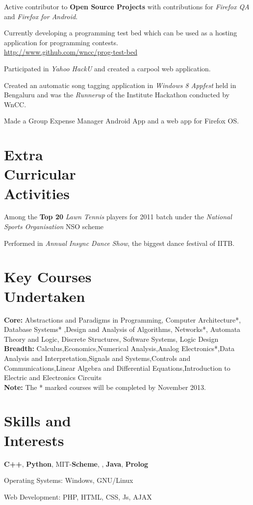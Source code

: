 \documentclass[margin,11pt]{resume}
\begin{document}
\begin{resume}
\begin{list2}
\item Active contributor to \textbf{Open Source Projects} with contributions for \emph{Firefox QA} and \emph{Firefox for Android}.
\item Currently developing a programming test bed which can be used as a hosting application for programming contests.\\ \url{http://www.github.com/wncc/prog-test-bed} 
\item Participated in \emph{Yahoo HackU} and created a carpool web application.
\item Created an automatic song tagging application in \emph{Windows 8 Appfest} held in Bengaluru and was the \emph{Runnerup} of the Institute Hackathon conducted by WnCC.
\item Made a Group Expense Manager Android App and a web app for Firefox OS.
\end{list2}

\section{\mysidestyle Extra \\ Curricular \\ Activities }
\begin{list2}
\item Among the \textbf{Top 20} \emph{Lawn Tennis} players for 2011 batch under the \emph{National Sports Organisation} NSO scheme
\item Performed in \emph{Annual Insync Dance Show}, the biggest dance festival of IITB.
\end{list2}
\section{\mysidestyle Key Courses\\Undertaken}

\textbf{Core:} 
Abstractions and Paradigms in Programming, Computer Architecture*, Database Systems* ,Design and Analysis of Algorithms, Networks*, Automata Theory and Logic, Discrete Structures, Software Systems, Logic Design\\
\textbf{Breadth:} 
Calculus,Economics,Numerical Analysis,Analog Electronics*,Data Analysis and Interpretation,Signals and Systems,Controls and Communications,Linear Algebra and Differential Equations,Introduction to Electric and Electronics Circuits \\
\textbf{Note:} The * marked courses will be completed by November 2013.

\section{\mysidestyle Skills and\\Interests} 
\begin{list2}
\item \textbf{C++}, \textbf{Python}, MIT-\textbf{Scheme}, \LaTeXe, \textbf{Java}, \textbf{Prolog}
\item Operating Systems: Windows, GNU/Linux
\item  Web Development: PHP, HTML, CSS, Js, AJAX
\end{list2}

\end{resume}
\end{document}
